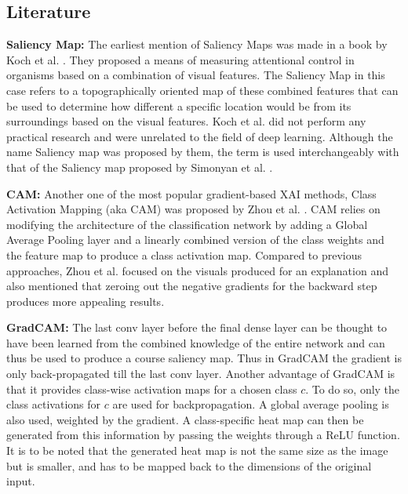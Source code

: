 \documentclass[a4paper,11pt,openright]{book}
\begin{document}
\subsection{Literature}
\textbf{Saliency Map: } The earliest mention of Saliency Maps was made in a book by Koch et al. \cite{ullman1988attention}. They proposed a means of measuring attentional control in organisms based on a combination of visual features. The Saliency Map in this case refers to a topographically oriented map of these combined features that can be used to determine how different a specific location would be from its surroundings based on the visual features. Koch et al. did not perform any practical research and were unrelated to the field of deep learning. Although the name Saliency map was proposed by them, the term is used interchangeably with that of the Saliency map proposed by Simonyan et al. \cite{simonyanDeepConvolutionalNetworks2014}.

\textbf{CAM: } Another one of the most popular gradient-based XAI methods, Class Activation Mapping (aka CAM) was proposed by Zhou et al. \cite{zhouLearningDeepFeatures2016}. CAM relies on modifying the architecture of the classification network by adding a Global Average Pooling layer and a linearly combined version of the class weights and the feature map to produce a class activation map. Compared to previous approaches, Zhou et al. focused on the visuals produced for an explanation and also mentioned that zeroing out the negative gradients for the backward step produces more appealing results.

\textbf{GradCAM: } The last conv layer before the final dense layer can be thought to have been learned from the combined knowledge of the entire network and can thus be used to produce a course saliency map. Thus in GradCAM \cite{selvarajuGradCAMVisualExplanations} the gradient is only back-propagated till the last conv layer. Another advantage of GradCAM is that it provides class-wise activation maps for a chosen class $c$. To do so, only the class activations for $c$ are used for backpropagation. A global average pooling is also used, weighted by the gradient. A class-specific heat map can then be generated from this information by passing the weights through a ReLU function. It is to be noted that the generated heat map is not the same size as the image but is smaller, and has to be mapped back to the dimensions of the original input.
\end{document}
